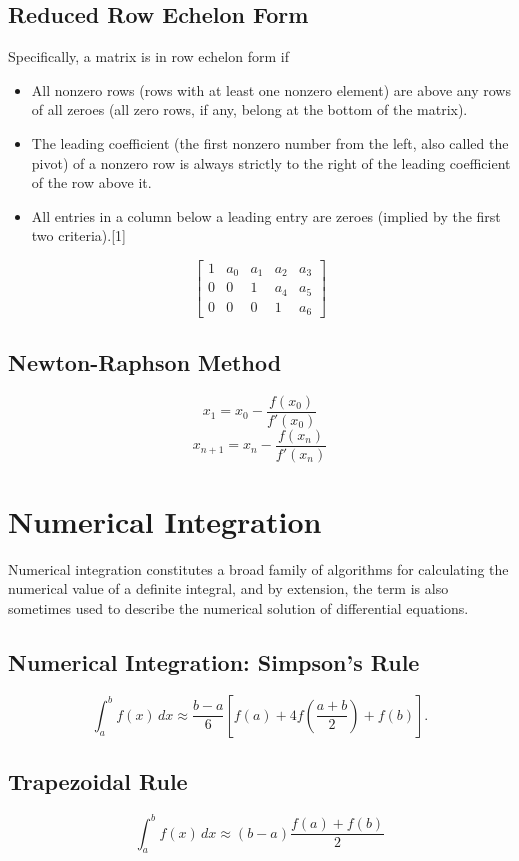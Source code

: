 \documentclass[12pt, a4paper]{article}
\begin{document}
\subsection*{Reduced Row Echelon Form}

Specifically, a matrix is in row echelon form if
\begin{itemize}
\item All nonzero rows (rows with at least one nonzero element) are above any rows of all zeroes (all zero rows, if any, belong at the bottom of the matrix).
\item The leading coefficient (the first nonzero number from the left, also called the pivot) of a nonzero row is always strictly to the right of the leading coefficient of the row above it.
\item All entries in a column below a leading entry are zeroes (implied by the first two criteria).[1]
\end{itemize}
\[\left[ \begin{array}{ccccc}
1 & a_0 & a_1 & a_2 & a_3 \\
0 & 0 & 1 & a_4 & a_5 \\
0 & 0 & 0 & 1 & a_6
\end{array} \right]\]
\newpage
\subsection*{Newton-Raphson Method}
\[x_{1} = x_0 - \frac{f(x_0)}{f'(x_0)}\]
\[x_{n+1} = x_n - \frac{f(x_n)}{f'(x_n)} \]

\section*{Numerical Integration}
Numerical integration constitutes a broad family of algorithms for calculating the numerical value of a definite integral, and by extension, the term is also sometimes used to describe the numerical solution of differential equations.
\subsection*{Numerical Integration: Simpson's Rule}
\[\int_{a}^{b} f(x) \, dx \approx \frac{b-a}{6}\left[f(a) + 4f\left(\frac{a+b}{2}\right)+f(b)\right].\]


\subsection*{Trapezoidal Rule}
\[\int_{a}^{b} f(x)\, dx \approx (b-a)\frac{f(a) + f(b)}{2}\]
\end{document}
